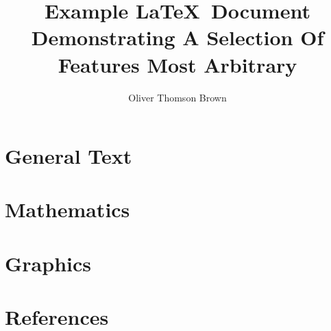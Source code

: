 \documentclass[a4paper,11pt,twoside]{article}		%
\author{Oliver Thomson Brown}
\title{\textbf{Example \LaTeX\ Document} \\ {\Fontamici Demonstrating A Selection Of Features Most Arbitrary}}
\date{}
\begin{document}
\maketitle

\tableofcontents

\section{General Text}

\section{Mathematics}

\section{Graphics}

\section{References}
\end{document}
